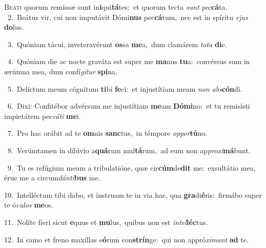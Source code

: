 \lettrine{\initial\textcolor{\initialcolor}{B}}{eáti} quorum remíssæ sunt in\-\textbf{i}\-qui\-\textbf{tá}\-tes:~\star et quorum tecta \textit{sunt} \textit{pec}\-\textbf{cá}ta.\\
{\numbfont\textcolor{\numbcolor}{~2.}}~Beátus vir, cui non imputávit Dómi\textbf{nus} pec\-\textbf{cá}\-tum,~\star nec est in spíritu \textit{e}\-\textit{jus} \textbf{do}\-lus.\par
{\numbfont\textcolor{\numbcolor}{~3.}}~Quóniam tácui, inveteravérunt \textbf{os}\-sa \textbf{me}\-a,~\star dum clamárem \textit{to}\-\textit{ta} \textbf{di}\-e.\par
{\numbfont\textcolor{\numbcolor}{~4.}}~Quóniam die ac nocte graváta est super me \textbf{ma}\-nus \textbf{tu}\-a:~\star convérsus sum in ærúmna mea, dum confí\-\textit{gi}\-\textit{tur} \textbf{spi}\-na.\par
{\numbfont\textcolor{\numbcolor}{~5.}}~Delíctum meum cógnitum \textbf{ti}\-bi \textbf{fe}\-ci:~\star et injustítiam meam \textit{non} \textit{abs}\-\textbf{cón}di.\par
{\numbfont\textcolor{\numbcolor}{~6.}}~Dixi: Confitébor advérsum me injustítiam \textbf{me}\-am \textbf{Dó}\-\textbf{mi}no:~\star et tu remisísti impietátem pec\-\textit{cá}\-\textit{ti} \textbf{me}\-i.\par
{\numbfont\textcolor{\numbcolor}{~7.}}~Pro hac orábit ad te \textbf{om}\-nis \textbf{sanc}\-tus,~\star in témpore \textit{op}\-\textit{por}\textbf{tú}no.\par
{\numbfont\textcolor{\numbcolor}{~8.}}~Verúmtamen in dilúvio a\-\textbf{quá}\-rum mul\-\textbf{tá}\-rum,~\star ad eum non ap\-\textit{pro}\-\textit{xi}\textbf{má}bunt.\par
{\numbfont\textcolor{\numbcolor}{~9.}}~Tu es refúgium meum a tribulatióne, quæ cir\-\textbf{cúm}\-de\textbf{dit} me:~\star exsultátio mea, érue me a circum\-\textit{dán}\-\textit{ti}\textbf{bus} me.\par
{\numbfont\textcolor{\numbcolor}{10.}}~Intelléctum tibi dabo, et ínstruam te in via hac, qua \textbf{gra}\-di\-\textbf{é}\-ris:~\star firmábo super te ó\-\textit{cu}\-\textit{los} \textbf{me}\-os.\par
{\numbfont\textcolor{\numbcolor}{11.}}~Nolíte fíeri sicut \textbf{e}\-quus et \textbf{mu}\-lus,~\star quibus non est \textit{in}\-\textit{tel}\textbf{léc}tus.\par
{\numbfont\textcolor{\numbcolor}{12.}}~In camo et freno maxíllas e\-\textbf{ó}\-rum con\-\textbf{strín}\-ge:~\star qui non appró\-\textit{xi}\-\textit{mant} \textbf{ad} te.\par
